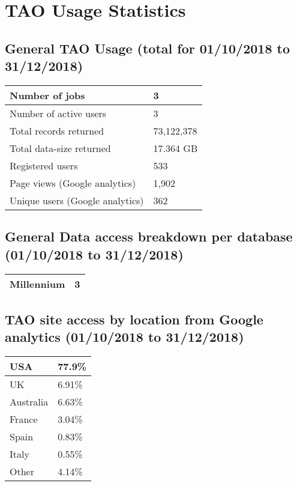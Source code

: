 \documentclass{article}%
\begin{document}
\section{TAO Usage Statistics}%

%
\subsection{General TAO Usage (total for 01/10/2018 to 31/12/2018)}%

%
\begin{longtabu}{X[l] X[l]}%
Number of jobs&3\\%
\hline%
Number of active users&3\\%
\hline%
Total records returned&73,122,378\\%
\hline%
Total data{-}size returned&17.364 GB\\%
\hline%
Registered users&533\\%
\hline%
Page views (Google analytics)&1,902\\%
\hline%
Unique users (Google analytics)&362\\%
\hline%
\end{longtabu}%
\subsection{General Data access breakdown per database (01/10/2018 to 31/12/2018)}%

%
\begin{longtabu}{X[l] X[l]}%
Millennium&3\\%
\hline%
\end{longtabu}%
\subsection{TAO site access by location from Google analytics (01/10/2018 to 31/12/2018)}%

%
\begin{longtabu}{X[l] X[l]}%
USA&77.9\%\\%
\hline%
UK&6.91\%\\%
\hline%
Australia&6.63\%\\%
\hline%
France&3.04\%\\%
\hline%
Spain&0.83\%\\%
\hline%
Italy&0.55\%\\%
\hline%
Other&4.14\%\\%
\hline%
\end{longtabu}%
\end{document}
